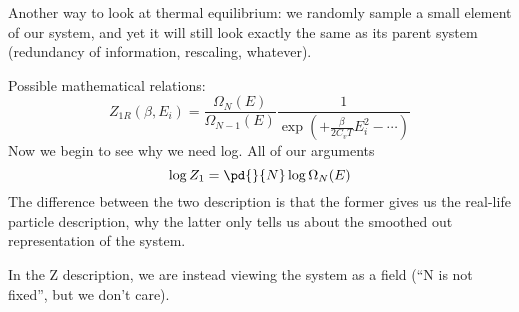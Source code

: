             Another way to look at thermal equilibrium:
            we randomly sample a small element of our system,
            and yet it will still look exactly the same
            as its parent system (redundancy of information, rescaling, whatever).

            Possible mathematical relations:
            \[Z_{1R}(\beta,E_i)  = \frac{\Omega_N(E)}{ \Omega_{N-1}(E)}
                             \frac1{\exp(+ \frac{\beta}{2C_v T}E_i^2
                                         - \cdots  )}\]
            Now we begin to see why we need log. All of our arguments
            \[\log Z_1 = \pd{}{N}\log \Omega_N(E)\]
            The difference between the two description is that
            the former gives us the real-life particle description,
            why the latter only tells us about the smoothed out representation of the system.

            In the Z description,
            we are instead viewing the system as a field (``N is not fixed'', but we don't care).\\

        



